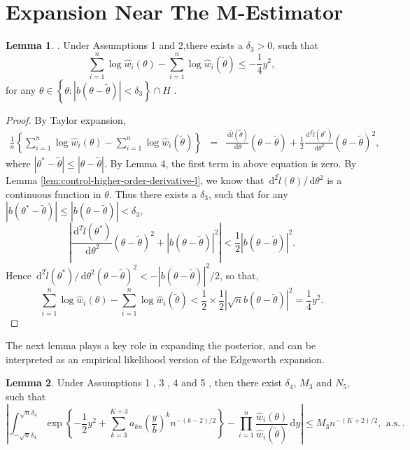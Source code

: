 \documentclass[oneside,english]{amsbook}
\numberwithin{section}{chapter}
\numberwithin{equation}{section}
\numberwithin{figure}{section}
\theoremstyle{plain}
\theoremstyle{plain}
\theoremstyle{definition}
\theoremstyle{plain}
\theoremstyle{plain}
\theoremstyle{remark}
\theoremstyle{definition}
\newtheorem{lemma}{Lemma}
\theoremstyle{definition}
\newcommand{\diff}{\,\mathrm{d}}
\newcommand{\ascv}{\,\mathrm{a.s.}\,}
\begin{document}
\section{Expansion Near The M-Estimator}
\begin{lemma}
\label{lem:near-mean-2nd-order-bound-1}.  Under  Assumptions 1 and 2,there exists a $\delta_{3}>0$,
such that 
\[
\sum_{i=1}^{n}\log\hat{w}_{i}\left(\theta\right)-\sum_{i=1}^{n}\log\hat{w}_{i}\left(\tilde{\theta}\right)\le-\frac{1}{4}y^{2},
\]
for any $\theta\in\left\{ \theta:\left|b\left(\theta-\tilde{\theta}\right)\right|<\delta_{3}\right\} \cap H$
. \end{lemma}
\begin{proof}
By Taylor expansion, 
\begin{eqnarray*}
\frac{1}{n}\left\{ \sum_{i=1}^{n}\log\hat{w}_{i}\left(\theta\right)-\sum_{i=1}^{n}\log\hat{w}_{i}\left(\tilde{\theta}\right)\right\}  & = & \frac{\diff\tilde{l}\left(\tilde{\theta}\right)}{\diff\theta}\left(\theta-\tilde{\theta}\right)+\frac{1}{2}\frac{\diff^{2}\tilde{l}\left(\theta^{*}\right)}{\diff\theta^{2}}\left(\theta-\tilde{\theta}\right)^{2},
\end{eqnarray*}
where $\left|\theta^{*}-\tilde{\theta}\right|\le\left|\theta-\tilde{\theta}\right|$.
By Lemma 4, the first term in above equation
is zero. By Lemma \ref{lem:control-higher-order-derivative-l}, we
know that $\diff^{2}\tilde{l}\left(\theta\right)/\diff\theta^{2}$
is a continuous function in $\theta$. Thus there exists a $\delta_{3}$,
such that for any $\left|b\left(\theta^{*}-\tilde{\theta}\right)\right|\le\left|b\left(\theta-\tilde{\theta}\right)\right|<\delta_{3}$,
\[
\left|\frac{\diff^{2}\hat{l}\left(\theta^{*}\right)}{\diff\theta^{2}}\left(\theta-\tilde{\theta}\right)^{2}+\left|b\left(\theta-\tilde{\theta}\right)\right|^{2}\right|<\frac{1}{2}\left|b\left(\theta-\tilde{\theta}\right)\right|^{2}.
\]
Hence $\diff^{2}\tilde{l}\left(\theta^{*}\right)/\diff\theta^{2}\left(\theta-\tilde{\theta}\right)^{2}<-\left|b\left(\theta-\tilde{\theta}\right)\right|^{2}/2$,
 so that, 
\[
\sum_{i=1}^{n}\log\hat{w}_{i}\left(\theta\right)-\sum_{i=1}^{n}\log\hat{w}_{i}\left(\tilde{\theta}\right)<\frac{1}{2}\times\frac{1}{2}\left|\sqrt{n}b\left(\theta-\tilde{\theta}\right)\right|^{2}=\frac{1}{4}y^{2}.
\]
\end{proof}
The next lemma plays a key role in expanding the posterior, and can be interpreted as an empirical likelihood version of the Edgeworth expansion. 
\begin{lemma}
\label{lem:central-expansion-lik} Under  Assumptions 1 , 3 , 4 and 5 , then there exist $\delta_{4}$, $M_{3}$
and $N_{5}$, such that 
\[
\left|\int_{-\sqrt{n}\delta_{4}}^{\sqrt{n}\delta_{4}}\exp\left\{ -\frac{1}{2}y^{2}+\sum_{k=3}^{K+3}a_{kn}\left(\frac{y}{b}\right)^{k}n^{-\left(k-2\right)/2}\right\} -\prod_{i=1}^{n}\frac{\hat{w}_{i}\left(\theta\right)}{\hat{w}_{i}\left(\tilde{\theta}\right)}\diff y\right|\le M_{3}n^{-\left(K+2\right)/2},\:\ascv.
\]
\end{lemma}
\end{document}
